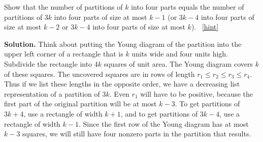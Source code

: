 \documentclass{book}
\begin{document}
\setcounter{project}{307}
\addtocounter{project}{-1}
\begin{activity}[]\label{rectanglecomplement}
\hypertarget{p-1580}{}%
Show that the number of partitions of \(k\) into four parts equals the number of partitions of \(3k\) into four parts of size at most \(k-1\) (or \(3k-4\) into four parts of size at most \(k-2\) or \(3k-4\) into four parts of size at most \(k\)).%
~\hfill{\tiny\hyperlink{a-307}{[hint]}\hypertarget{q-307}{}}\par\smallskip%
\noindent\textbf{Solution.}\hypertarget{solution-231}{}\quad%
\hypertarget{p-1582}{}%
Think about putting the Young diagram of the partition into the upper left corner of a rectangle that is \(k\) units wide and four units high. Subdivide the rectangle into \(4k\) squares of unit area. The Young diagram covers \(k\) of these squares. The uncovered squares are in rows of length \(r_1\le r_2\le r_3\le r_4\). Thus if we list these lengths in the opposite order, we have a decreasing list representation of a partition of \(3k\). Even \(r_1\) will have to be positive, because the first part of the original partition will be at most \(k-3\). To get partitions of \(3k+4\), use a rectangle of width \(k+1\), and to get partitions of \(3k-4\), use a rectangle of width \(k-1\). Since the first row of the Young diagram has at most \(k-3\) squares, we will still have four nonzero parts in the partition that results.%
\end{activity}
\end{document}
